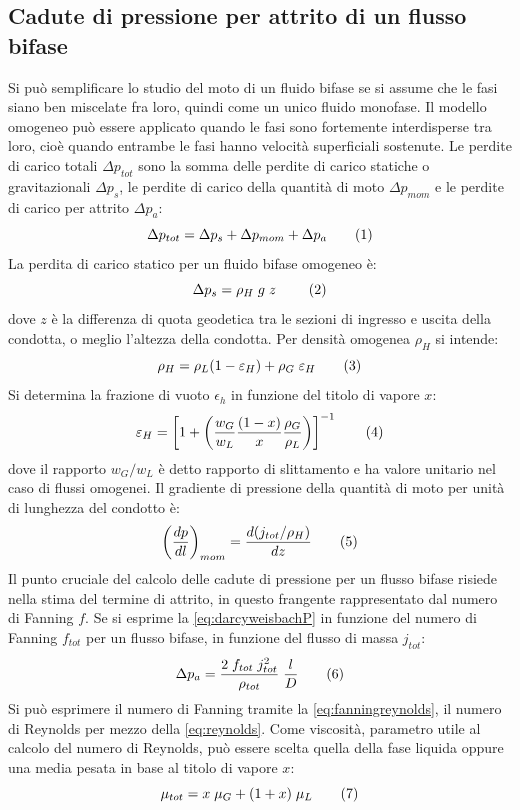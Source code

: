 \subsection{Cadute di pressione per attrito di un flusso bifase}
Si può semplificare lo studio del moto di un fluido bifase se si assume che le fasi siano ben miscelate fra loro, quindi come un unico fluido monofase. Il modello omogeneo può essere applicato quando le fasi sono fortemente interdisperse tra loro, cioè quando entrambe le fasi hanno velocità superficiali sostenute. Le perdite di carico totali \(\Delta p_{tot}\) sono la somma delle perdite di carico statiche o gravitazionali \(\Delta p_s\), le perdite di carico della quantità di moto \(\Delta p_{mom}\) e le perdite di carico per attrito \(\Delta p_a\): 
\[\Delta p_{tot} = \Delta p_s +\Delta p_{mom} + \Delta p_a \addtag \label{eq:perditetot}\]
La perdita di carico statico per un fluido bifase omogeneo è:
\[\Delta p_s = \rho_H \; g \; z\ \addtag \]
dove \(z\) è la differenza di quota geodetica tra le sezioni di ingresso e uscita della condotta, o meglio l'altezza della condotta. Per densità omogenea \(\rho_H\) si intende:
\[\rho_H=\rho_L(1-\epsilon_H)+\rho_G \; \epsilon_H \addtag \label{eq:omogenea} \]
Si determina la frazione di vuoto \(\epsilon_h\) in funzione del titolo di vapore \(x\):
\[\epsilon_H = \left[ 1+ \left( \dfrac{w_G}{w_L} \dfrac{(1-x)}{x} \dfrac{\rho_G}{\rho_L} \right) \right]^{-1} \addtag \]
dove il rapporto \(w_G/w_L\) è detto rapporto di slittamento e ha valore unitario nel caso di flussi omogenei. Il gradiente di pressione della quantità di moto per unità di lunghezza del condotto è:
\[\left( \dfrac{dp}{dl} \right)_{mom}=\dfrac{d(j_{tot}/\rho_H)}{dz} \addtag \]
Il punto cruciale del calcolo delle cadute di pressione per un flusso bifase risiede nella stima del termine di attrito, in questo frangente rappresentato dal numero di Fanning \(f\). Se si esprime la \eqref{eq:darcyweisbachP} in funzione del numero di Fanning \(f_{tot}\) per un flusso bifase, in funzione del flusso di massa \(j_{tot}\):
\[\Delta p_a = \dfrac{2 \; f_{tot} \; j_{tot}^2}{\rho_{tot}} \; \dfrac{l}{D} \addtag \label{eq:darcyweisbachfanning2f} \]
Si può esprimere il numero di Fanning tramite la \eqref{eq:fanningreynolds}, il numero di Reynolds per mezzo della \eqref{eq:reynolds}. Come viscosità, parametro utile al calcolo del numero di Reynolds, può essere scelta quella della fase liquida oppure una media pesata in base al titolo di vapore \(x\):
\[\mu_{tot} =x \; \mu_G + (1+x) \; \mu_L \addtag \]
\\
